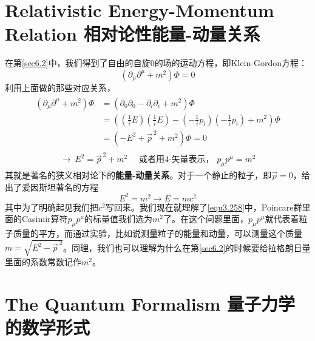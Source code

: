\section[相对论性能量-动量关系]{Relativistic Energy-Momentum Relation 相对论性能量-动量关系}\label{sec8.2}
在第\ref{sec6.2}中，我们得到了自由的自旋$0$的场的运动方程，即Klein-Gordon方程：
\[(\partial_\mu\partial^\mu+m^2)\Phi=0 \]
利用上面做的那些对应关系，
\begin{align}\begin{split}
(\partial_\mu\partial^\mu+m^2)\Phi&=(\partial_0\partial_0-\partial_i\partial_i+m^2)\Phi\\
&=\left(\left(\frac{1}{i}E\right)\left(\frac{1}{i}E\right)-\left(-\frac{1}{i}p_i\right)\left(-\frac{1}{i}p_i\right)+m^2\right)\Phi\\
&=(-E^2+\vec{p}^{\,2}+m^2)\Phi=0
\end{split}\end{align}
\begin{align}
\to\ E^2=\vec{p}^{\,2}+m^2\quad\text{ 或者用4-矢量表示， }p_\mu p^\mu=m^2
\end{align}
其就是著名的狭义相对论下的{\bf 能量-动量关系}。对于一个静止的粒子，即$\vec{p}=0$，给出了爱因斯坦著名的方程
\[E^2=m^2\to E=mc^2 \]
其中为了明确起见我们把$c^2$写回来。我们现在就理解了\eqref{equ3.258}中，Poincare群里面的Casimir算符$p_\mu p^\mu$的标量值我们选为$m^2$了。在这个问题里面，$p_\mu p^\mu$就代表着粒子质量的平方，而通过实验，比如说测量粒子的能量和动量，可以测量这个质量$m=\sqrt{E^2-\vec{p}^{\,2}}$。同理，我们也可以理解为什么在第\ref{sec6.2}的时候要给拉格朗日量里面的系数常数记作$m^2$。

\section[量子力学的数学形式]{The Quantum Formalism 量子力学的数学形式}

